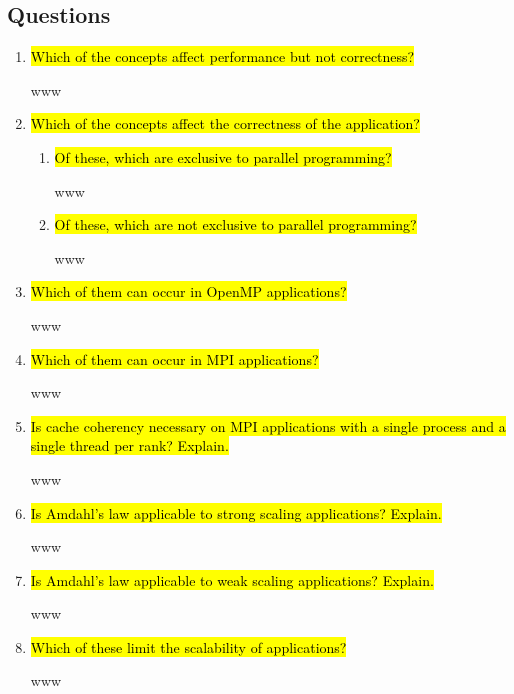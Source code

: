 \documentclass{article}
\begin{document}
\subsection{Questions}
\begin{enumerate}
	\item \hl{Which of the concepts affect performance but not correctness?}

	www

	\item \hl{Which of the concepts affect the correctness of the application?} ~

	\begin{enumerate}[label=\Alph*]
		\item \hl{Of these, which are exclusive to parallel programming?}

		www

		\item \hl{Of these, which are not exclusive to parallel programming?}

		www
	\end{enumerate}

	\item \hl{Which of them can occur in OpenMP applications?}

	www
	
	\item \hl{Which of them can occur in MPI applications?}

	www
	
	\item \hl{Is cache coherency necessary on MPI applications with a single process and a single thread per rank? Explain.}

	www
	
	\item \hl{Is Amdahl's law applicable to strong scaling applications? Explain.}

	www
	
	\item \hl{Is Amdahl's law applicable to weak scaling applications? Explain.}

	www
	
	\item \hl{Which of these limit the scalability of applications?}

	www
	
\end{enumerate}

\end{document}
